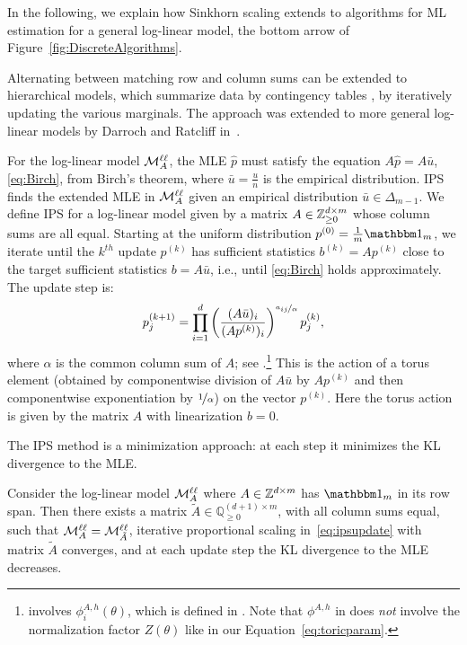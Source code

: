 In the following, we explain how Sinkhorn scaling extends to algorithms for ML estimation for a general log-linear model, the bottom arrow of Figure~\ref{fig:DiscreteAlgorithms}. 

Alternating between matching row and column sums can be extended to hierarchical models, which summarize data by contingency tables \cite{fienberg1970}, by iteratively updating the various marginals.
The approach was extended to more general log-linear models by 
Darroch and Ratcliff in~\cite{IPS-DR}.

For the log-linear model $\mathcal{M}^{\mathtt{\ell \ell}}_A$, the MLE $\hat{p}$ must satisfy the equation $A\hat{p} = A \bar{u}$, \eqref{eq:Birch}, from Birch's theorem, where $\bar{u} = \frac{u}{n}$ is the empirical distribution. 
IPS finds the extended MLE in $\mathcal{M}^{\mathtt{\ell \ell}}_A$ given an empirical distribution $\bar{u} \in \Delta_{m-1}$.
We define IPS for a log-linear model given by a matrix $A \in \mathbb Z_{\geq 0}^{d \times m}$ whose column sums are all equal. 
Starting at the uniform distribution $p^{(0)}= \frac{1}{m} \ones_m$, we iterate until the $k^{th}$ update $p^{(k)}$ has sufficient statistics $b^{(k)} = A p^{(k)}$ close to the target sufficient statistics $b = A \bar{u}$, i.e., until \eqref{eq:Birch} holds approximately.
The update step is:
\begin{equation}
	\label{eq:ipsupdate}
	p^{(k+1)}_j = \prod_{i = 1}^d \left( \frac{(A\bar{u})_i}{(Ap^{(k)})_i} \right)^{\nicefrac{a_{ij}}{\alpha}} p^{(k)}_j,
\end{equation}
where $\alpha$ is the common column sum of $A$; see \cite[Algorithm 7.3.11]{SullivantBook}.\footnote{\cite[Algorithm 7.3.11]{SullivantBook} involves $\phi_i^{A,h}(\theta)$, which is defined in \cite[Definition~6.2.2]{SullivantBook}. Note that $\phi^{A,h}$ in \cite{SullivantBook} does \emph{not} involve the normalization factor $Z(\theta)$ like in our Equation~\eqref{eq:toricparam}.}
This is the action of a torus element (obtained by componentwise division of $A \bar{u}$ by $A p^{(k)}$
and then componentwise exponentiation by $\nicefrac{1}{\alpha}$)
on the vector $p^{(k)}$.
Here the torus action is given by the matrix $A$ with linearization $b=0$.

The IPS method is a minimization approach: at each step it minimizes the KL divergence to the MLE.

\begin{prop}
	\label{prop:cap_KL}
	Consider the log-linear model $\mathcal{M}^{\mathtt{\ell \ell}}_A$ where $A \in \mathbb Z^{d \times m}$ has $\ones_m$ in its row span. Then there exists a matrix $\tilde{A} \in \mathbb{Q}_{\geq 0}^{(d+1) \times m}$, with all column sums equal, such that  $\mathcal{M}^{\mathtt{\ell \ell}}_A = \mathcal{M}^{\mathtt{\ell \ell}}_{\tilde{A}}$, iterative proportional scaling in~\eqref{eq:ipsupdate} with matrix $\tilde A$ converges, and at each update step the KL divergence to the MLE decreases.
\end{prop}

